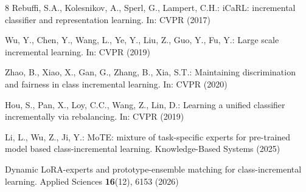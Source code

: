 \documentclass[runningheads]{llncs}
\begin{document}
\begin{thebibliography}{8}
Rebuffi, S.A., Kolesnikov, A., Sperl, G., Lampert, C.H.: iCaRL: incremental
classifier and representation learning. In: CVPR (2017)

Wu, Y., Chen, Y., Wang, L., Ye, Y., Liu, Z., Guo, Y., Fu, Y.: Large scale
incremental learning. In: CVPR (2019)

Zhao, B., Xiao, X., Gan, G., Zhang, B., Xia, S.T.: Maintaining discrimination
and fairness in class incremental learning. In: CVPR (2020)

Hou, S., Pan, X., Loy, C.C., Wang, Z., Lin, D.: Learning a unified classifier
incrementally via rebalancing. In: CVPR (2019)

Li, L., Wu, Z., Ji, Y.: MoTE: mixture of task-specific experts for pre-trained
model based class-incremental learning. Knowledge-Based Systems (2025)

Dynamic LoRA-experts and prototype-ensemble matching for class-incremental
learning. Applied Sciences \textbf{16}(12), 6153 (2026)

\end{thebibliography}
\end{document}
